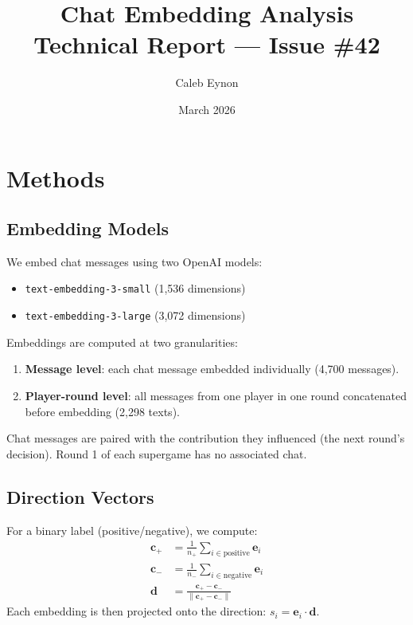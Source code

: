 \documentclass[11pt,oneside]{article}
\title{Chat Embedding Analysis\\
\large Technical Report --- Issue \#42}
\author{Caleb Eynon}
\date{March 2026}
\begin{document}
\maketitle

\tableofcontents
\newpage

\section{Methods}

\subsection{Embedding Models}

We embed chat messages using two OpenAI models:
\begin{itemize}
    \item \texttt{text-embedding-3-small} (1,536 dimensions)
    \item \texttt{text-embedding-3-large} (3,072 dimensions)
\end{itemize}

Embeddings are computed at two granularities:
\begin{enumerate}
    \item \textbf{Message level}: each chat message embedded individually (4,700 messages).
    \item \textbf{Player-round level}: all messages from one player in one round concatenated before embedding (2,298 texts).
\end{enumerate}

Chat messages are paired with the contribution they influenced (the next round's decision). Round 1 of each supergame has no associated chat.

\subsection{Direction Vectors}

For a binary label (positive/negative), we compute:
\begin{align}
    \mathbf{c}_+ &= \frac{1}{n_+} \sum_{i \in \text{positive}} \mathbf{e}_i \\
    \mathbf{c}_- &= \frac{1}{n_-} \sum_{i \in \text{negative}} \mathbf{e}_i \\
    \mathbf{d} &= \frac{\mathbf{c}_+ - \mathbf{c}_-}{\|\mathbf{c}_+ - \mathbf{c}_-\|}
\end{align}
Each embedding is then projected onto the direction: $s_i = \mathbf{e}_i \cdot \mathbf{d}$.
\end{document}

